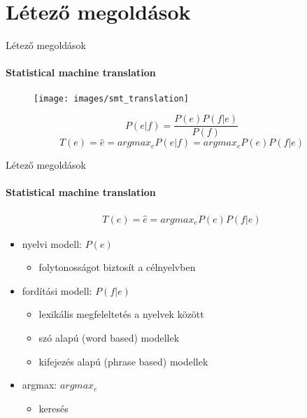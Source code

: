 \section{Létező megoldások}
\begin{frame}{Létező megoldások}
\framesubtitle{Statistical machine translation}
	
	\begin{figure}[t]
		\texttt{[image: images/smt\_translation]}
 	\end{figure}

	\begin{equation}
		P(e|f) = \frac{P(e)P(f|e)}{P(f)}
	\end{equation}
	\begin{equation}
		T(e) = \hat{e} = argmax_e P(e|f) = argmax_e P(e) P(f|e)
	\end{equation}
	
	
\end{frame}

\begin{frame}{Létező megoldások}
\framesubtitle{Statistical machine translation}

	\begin{align*}
		T(e) = \hat{e} = argmax_e P(e) P(f|e)
	\end{align*}
	
	\begin{itemize}

		\item
			nyelvi modell: $P(e)$
			\begin{itemize}
				\item
					folytonosságot biztosít a célnyelvben
			\end{itemize}

		\item
			fordítási modell: $P(f|e)$
				\begin{itemize}
					\item
			 			lexikális megfeleltetés a nyelvek között
			 		\item
			 			szó alapú (word based) modellek \cite{Brown:1990} \cite{Berger:1994}
			 		\item
			 			kifejezés alapú (phrase based) modellek \cite{Och99improvedalignment} \cite{Marcu:2002}
			 	\end{itemize}
		\item
			argmax: $argmax_e$
			\begin{itemize}
				\item
					keresés
			\end{itemize}
	\end{itemize}
	
	
\end{frame}

